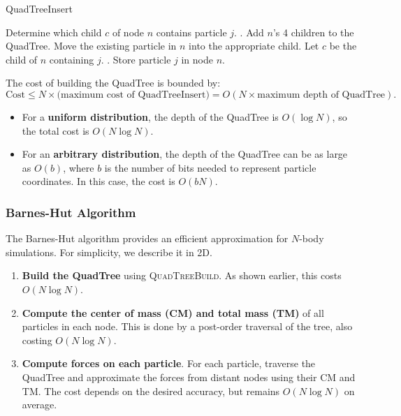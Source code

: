 \documentclass[12pt]{book}
\begin{document}
\begin{algorithm}[H]
\caption{QuadTreeInsert}
\begin{algorithmic}[1]
    \State {}
    \State {}
        \State {}
        \State Determine which child $c$ of node $n$ contains particle $j$.
        \State {}.
        \State {}
        \State Add $n$'s 4 children to the QuadTree.
        \State Move the existing particle in $n$ into the appropriate child.
        \State Let $c$ be the child of $n$ containing $j$.
        \State {}.
    \Else
        \State {}
        \State Store particle $j$ in node $n$.
    \EndIf
\EndProcedure
\end{algorithmic}
\end{algorithm}

\noindent
The cost of building the QuadTree is bounded by:
\[
\text{Cost} \leq N \times \text{(maximum cost of QuadTreeInsert)} 
   = O(N \times \text{maximum depth of QuadTree}).
\]

\begin{itemize}
    \item For a \textbf{uniform distribution}, the depth of the QuadTree is 
    $O(\log N)$, so the total cost is $O(N\log N)$.
    \item For an \textbf{arbitrary distribution}, the depth of the QuadTree can be as large as 
    $O(b)$, where $b$ is the number of bits needed to represent particle coordinates. 
    In this case, the cost is $O(bN)$.
\end{itemize}

\subsubsection{Barnes-Hut Algorithm}
The Barnes-Hut algorithm provides an efficient approximation for $N$-body simulations. For simplicity, we describe it in 2D.

\begin{enumerate}
    \item \textbf{Build the QuadTree} using \textsc{QuadTreeBuild}.  
    As shown earlier, this costs $O(N\log N)$.
    \item \textbf{Compute the center of mass (CM) and total mass (TM)} of all particles in each node.  
    This is done by a post-order traversal of the tree, also costing $O(N\log N)$.
    \item \textbf{Compute forces on each particle}.  
    For each particle, traverse the QuadTree and approximate the forces from distant nodes using their CM and TM.  
    The cost depends on the desired accuracy, but remains $O(N\log N)$ on average.
\end{enumerate}
\end{document}
